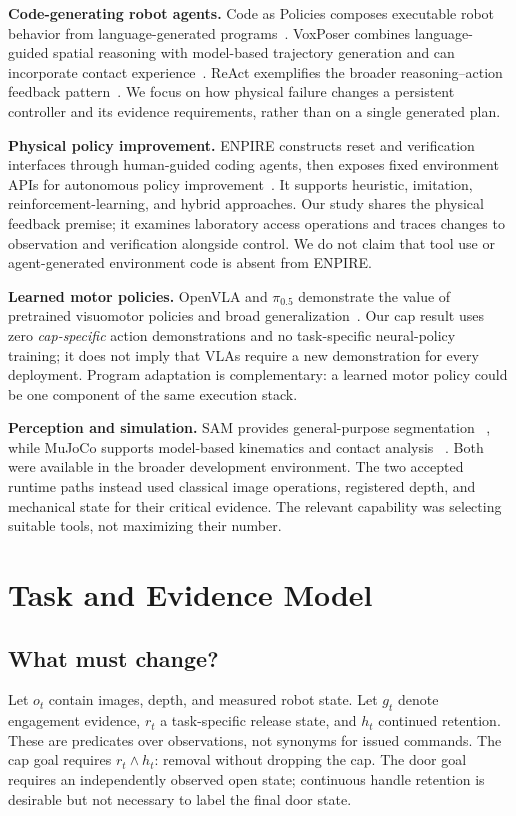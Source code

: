\textbf{Code-generating robot agents.} Code as Policies composes executable
robot behavior from language-generated programs~\cite{cap}. VoxPoser combines
language-guided spatial reasoning with model-based trajectory generation and
can incorporate contact experience~\cite{voxposer}. ReAct exemplifies the
broader reasoning--action feedback pattern~\cite{react}. We focus on how
physical failure changes a persistent controller and its evidence requirements,
rather than on a single generated plan.

\textbf{Physical policy improvement.} ENPIRE constructs reset and verification
interfaces through human-guided coding agents, then exposes fixed environment
APIs for autonomous policy improvement~\cite{enpire}. It supports heuristic,
imitation, reinforcement-learning, and hybrid approaches. Our study shares the
physical feedback premise; it examines laboratory access operations and traces
changes to observation and verification alongside control. We do not claim
that tool use or agent-generated environment code is absent from ENPIRE.

\textbf{Learned motor policies.} OpenVLA and $\pi_{0.5}$ demonstrate the value
of pretrained visuomotor policies and broad generalization~\cite{openvla,pi05}.
Our cap result uses zero \emph{cap-specific} action demonstrations and no
task-specific neural-policy training; it does not imply that VLAs require a
new demonstration for every deployment. Program adaptation is complementary:
a learned motor policy could be one component of the same execution stack.

\textbf{Perception and simulation.} SAM provides general-purpose segmentation
~\cite{sam}, while MuJoCo supports model-based kinematics and contact analysis
~\cite{mujoco}. Both were available in the broader development environment.
The two accepted runtime paths instead used classical image operations,
registered depth, and mechanical state for their critical evidence. The
relevant capability was selecting suitable tools, not maximizing their number.

\section{Task and Evidence Model}
\subsection{What must change?}
Let $o_t$ contain images, depth, and measured robot state. Let $g_t$ denote
engagement evidence, $r_t$ a task-specific release state, and $h_t$ continued
retention. These are predicates over observations, not synonyms for issued
commands. The cap goal requires $r_t\land h_t$: removal without dropping the
cap. The door goal requires an independently observed open state; continuous
handle retention is desirable but not necessary to label the final door state.

